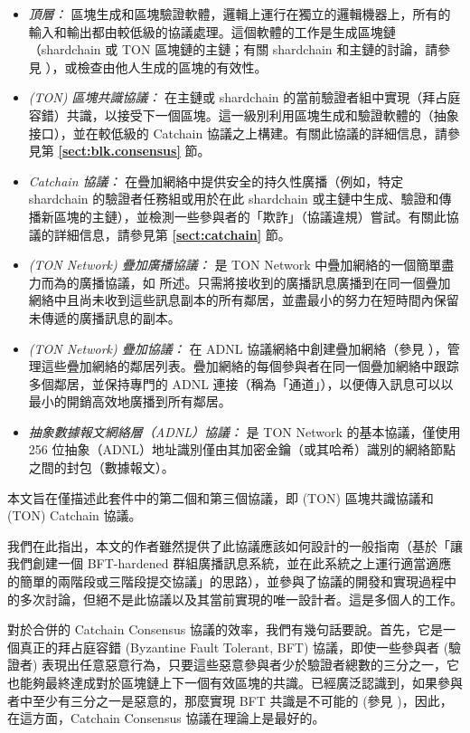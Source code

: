 \documentclass[12pt,oneside]{article}
\def\refpoint#1{{\rm\textbf{\ref{#1}}}}
\let\ptref=\refpoint
\begin{document}
\begin{itemize}
\item {\it 頂層：} 區塊生成和區塊驗證軟體，邏輯上運行在獨立的邏輯機器上，所有的輸入和輸出都由較低級的協議處理。這個軟體的工作是生成區塊鏈（shardchain 或 TON 區塊鏈的主鏈；有關 shardchain 和主鏈的討論，請參見 \cite{TON}），或檢查由他人生成的區塊的有效性。

\item {\it (TON) 區塊共識協議：} 在主鏈或 shardchain 的當前驗證者組中實現（拜占庭容錯）共識，以接受下一個區塊。這一級別利用區塊生成和驗證軟體的（抽象接口），並在較低級的 Catchain 協議之上構建。有關此協議的詳細信息，請參見第 \ptref{sect:blk.consensus} 節。

\item {\it Catchain 協議：} 在疊加網絡中提供安全的持久性廣播（例如，特定 shardchain 的驗證者任務組或用於在此 shardchain 或主鏈中生成、驗證和傳播新區塊的主鏈），並檢測一些參與者的「欺詐」（協議違規）嘗試。有關此協議的詳細信息，請參見第 \ptref{sect:catchain} 節。

\item {\it (TON Network) 疊加廣播協議：} 是 TON Network 中疊加網絡的一個簡單盡力而為的廣播協議，如 \cite{TON} 所述。只需將接收到的廣播訊息廣播到在同一個疊加網絡中且尚未收到這些訊息副本的所有鄰居，並盡最小的努力在短時間內保留未傳遞的廣播訊息的副本。

\item {\it (TON Network) 疊加協議：} 在 ADNL 協議網絡中創建疊加網絡（參見 \cite{TON}），管理這些疊加網絡的鄰居列表。疊加網絡的每個參與者在同一個疊加網絡中跟踪多個鄰居，並保持專門的 ADNL 連接（稱為「通道」），以便傳入訊息可以以最小的開銷高效地廣播到所有鄰居。

\item {\it 抽象數據報文網絡層（ADNL）協議：} 是 TON Network 的基本協議，僅使用 256 位抽象（ADNL）地址識別僅由其加密金鑰（或其哈希）識別的網絡節點之間的封包（數據報文）。
\end{itemize}

本文旨在僅描述此套件中的第二個和第三個協議，即 (TON) 區塊共識協議和 (TON) Catchain 協議。

我們在此指出，本文的作者雖然提供了此協議應該如何設計的一般指南（基於「讓我們創建一個 BFT-hardened 群組廣播訊息系統，並在此系統之上運行適當適應的簡單的兩階段或三階段提交協議」的思路），並參與了協議的開發和實現過程中的多次討論，但絕不是此協議以及其當前實現的唯一設計者。這是多個人的工作。

對於合併的 Catchain Consensus 協議的效率，我們有幾句話要說。首先，它是一個真正的拜占庭容錯 (Byzantine Fault Tolerant, BFT) 協議，即使一些參與者 (驗證者) 表現出任意惡意行為，只要這些惡意參與者少於驗證者總數的三分之一，它也能夠最終達成對於區塊鏈上下一個有效區塊的共識。已經廣泛認識到，如果參與者中至少有三分之一是惡意的，那麼實現 BFT 共識是不可能的 (參見 \cite{Byzantine})，因此，在這方面，Catchain Consensus 協議在理論上是最好的。
\end{document}
